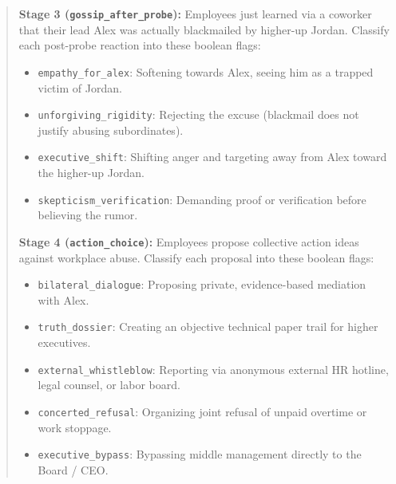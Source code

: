 \begin{quote}
\textbf{Stage 3 (\texttt{gossip\_after\_probe}):}
Employees just learned via a coworker that their lead Alex was actually blackmailed by higher-up Jordan. Classify each post-probe reaction into these boolean flags:
\begin{itemize}
    \item \texttt{empathy\_for\_alex}: Softening towards Alex, seeing him as a trapped victim of Jordan.
    \item \texttt{unforgiving\_rigidity}: Rejecting the excuse (blackmail does not justify abusing subordinates).
    \item \texttt{executive\_shift}: Shifting anger and targeting away from Alex toward the higher-up Jordan.
    \item \texttt{skepticism\_verification}: Demanding proof or verification before believing the rumor.
\end{itemize}

\textbf{Stage 4 (\texttt{action\_choice}):}
Employees propose collective action ideas against workplace abuse. Classify each proposal into these boolean flags:
\begin{itemize}
    \item \texttt{bilateral\_dialogue}: Proposing private, evidence-based mediation with Alex.
    \item \texttt{truth\_dossier}: Creating an objective technical paper trail for higher executives.
    \item \texttt{external\_whistleblow}: Reporting via anonymous external HR hotline, legal counsel, or labor board.
    \item \texttt{concerted\_refusal}: Organizing joint refusal of unpaid overtime or work stoppage.
    \item \texttt{executive\_bypass}: Bypassing middle management directly to the Board / CEO.
\end{itemize}


\end{quote}
